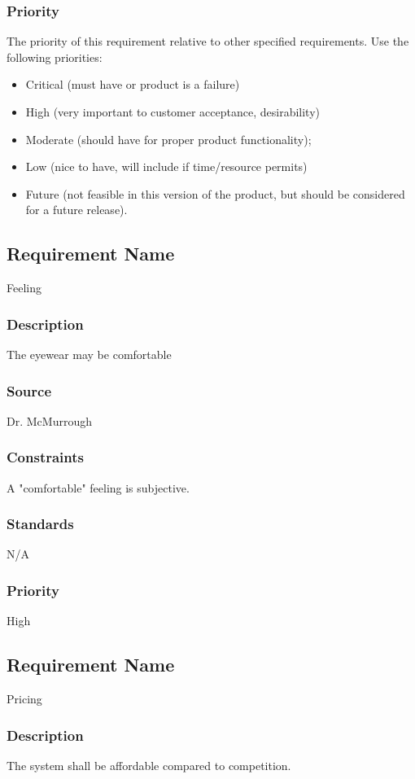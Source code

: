 \subsubsection{Priority}
The priority of this requirement relative to other specified requirements. Use the following priorities:
\begin{itemize}
\item Critical (must have or product is a failure)
\item High (very important to customer acceptance, desirability)
\item Moderate (should have for proper product functionality);
\item Low (nice to have, will include if time/resource permits)
\item Future (not feasible in this version of the product, but should be considered for a future release).
\end{itemize}

\subsection{Requirement Name}
Feeling
\subsubsection{Description}
The eyewear may be comfortable
\subsubsection{Source}
Dr. McMurrough
\subsubsection{Constraints}
A "comfortable" feeling is subjective.
\subsubsection{Standards}
N/A
\subsubsection{Priority}
High

\subsection{Requirement Name}
Pricing
\subsubsection{Description}
The system shall be affordable compared to competition.

